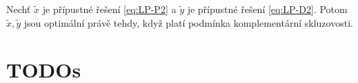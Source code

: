 \begin{vt}
    Nechť $\tilde{x}$ je přípustné řešení \ref{eq:LP-P2} a $\tilde{y}$ je přípustné řešení \ref{eq:LP-D2}. Potom $\tilde{x}, \tilde{y}$ jsou optimální právě tehdy, když platí podmínka komplementární skluzovosti.
\end{vt}


\section{TODOs}
